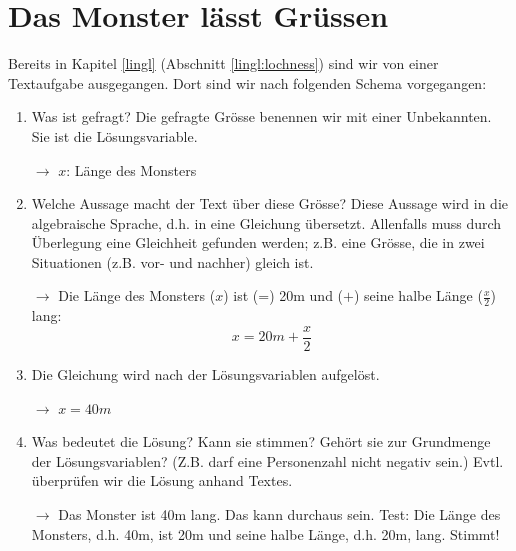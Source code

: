 \documentclass[%
11pt,%
twoside,%
titlepage,%
german,%
]{scrartcl}
\begin{document}
\section{Das Monster lässt Grüssen}
\label{lingltext:monster}

Bereits in Kapitel \ref{lingl} (Abschnitt \ref{lingl:lochness}) sind wir von einer Textaufgabe ausgegangen. Dort sind wir nach folgenden Schema vorgegangen:
\begin{enumerate}
\item Was ist gefragt? Die gefragte Gr\"osse benennen wir mit einer Unbekannten. Sie ist die L\"osungsvariable.

$\rightarrow$ $x$: L\"ange des Monsters
\item Welche Aussage macht der Text \"uber diese Gr\"osse? Diese Aussage wird in die algebraische Sprache, d.h. in eine Gleichung \"ubersetzt. Allenfalls muss durch \"Uberlegung eine Gleichheit gefunden werden; z.B. eine Gr\"osse, die in zwei Situationen (z.B. vor- und nachher) gleich ist.

$\rightarrow$ Die L\"ange des Monsters ($x$) ist (=) 20\unit{m} und ($+$) seine halbe L\"ange ($\frac{x}{2}$) lang: 
\begin{displaymath}
  x=20\unit{m}+\frac{x}{2}  
\end{displaymath}

\item Die Gleichung wird nach der L\"osungsvariablen aufgel\"ost.

$\rightarrow$ $x=40\unit{m}$

\item Was bedeutet die L\"osung? Kann sie stimmen? Geh\"ort sie zur Grundmenge der L\"osungsvariablen? (Z.B. darf eine Personenzahl nicht negativ sein.) Evtl. \"uberpr\"ufen wir die L\"osung anhand Textes.

$\rightarrow$ Das Monster ist 40\unit{m} lang. Das kann durchaus sein. Test: Die L\"ange des Monsters, d.h. 40\unit{m}, ist 20\unit{m} und seine halbe L\"ange, d.h. 20\unit{m}, lang. Stimmt!
\end{enumerate}



\clearpage
\listoffigures
%
%
\end{document}
